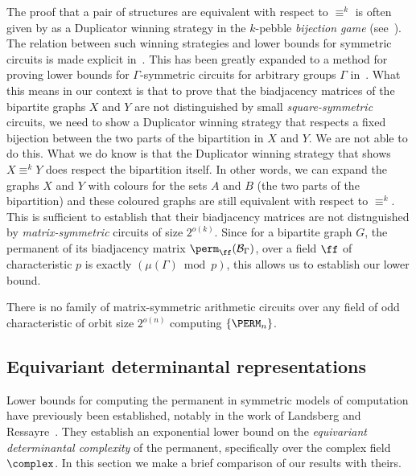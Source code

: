 \documentclass{toc}
\begin{document}
The proof that a pair of structures are equivalent with respect to $\equiv^k$ is often given by as a Duplicator winning strategy in the $k$-pebble \emph{bijection game} (see~\cite{DR07}).  The relation between such winning strategies and lower bounds for symmetric circuits is made explicit in~\cite{Dawar2016}.  This has been greatly expanded to a method for proving  lower bounds for $\Gamma$-symmetric circuits for arbitrary groups $\Gamma$ in~\cite{DWitcs22}.  What this means in our context is that to prove that the biadjacency matrices of the bipartite graphs $X$ and $Y$ are not distinguished by small
\emph{square-symmetric} %
circuits, we need to show a Duplicator winning strategy that respects a fixed bijection between the two parts of the bipartition in $X$ and $Y$.  We are not able to do this.  What we do know is that the Duplicator winning strategy that shows $X \equiv^k Y$ does respect the bipartition itself.  In other words, we can expand the graphs $X$ and $Y$ with colours for the sets $A$ and $B$ (the two parts of the bipartition) and these coloured graphs are still equivalent with respect to  $\equiv^k$.  This is sufficient to establish that their biadjacency matrices are not distnguished by \emph{matrix-symmetric} circuits of size $2^{o(k)}$.  Since for a bipartite graph $G$, the permanent of its biadjacency matrix $\perm_{\ff}(\mathcal{B}_\Gamma)$, over a field $\ff$ of characteristic $p$ is exactly $(\mu(\Gamma) \bmod p)$, this allows us to establish our lower bound.
\begin{theorem}\label{thm:lowerbound-matrix}
  There is no family of matrix-symmetric arithmetic circuits over any field of
  odd characteristic of orbit size $2^{o(n)}$ computing
  $\{\PERM_n\}$.
\end{theorem}




\subsection{Equivariant determinantal representations}\label{sec:equivariant}


Lower bounds for computing the permanent in symmetric models of computation have previously been established, notably in the work of Landsberg and Ressayre~\cite{LandsbergR16}.  They establish an exponential lower bound on the \emph{equivariant determinantal complexity} of the permanent, specifically over the complex field $\complex$.  In this section we make a brief comparison of our results with theirs.
\end{document}
